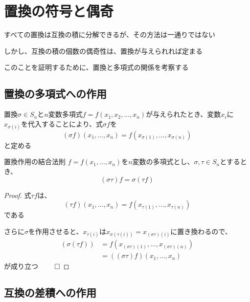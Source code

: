 \documentclass[../../../topic_linear-algebra]{subfiles}
\begin{document}
\sectionline
\section{置換の符号と偶奇}

すべての置換は互換の積に分解できるが、その方法は一通りではない

しかし、互換の積の個数の偶奇性は、置換が与えられれば定まる

\br

このことを証明するために、置換と多項式の関係を考察する

\subsection{置換の多項式への作用}

置換$\sigma \in S_n$と$n$変数多項式$f = f(x_1, x_2, \ldots, x_n)$が与えられたとき、変数$x_i$に$x_{\sigma(i)}$を代入することにより、式$\sigma f$を
\begin{equation*}
  (\sigma f)(x_1, \ldots, x_n) = f(x_{\sigma(1)}, \ldots, x_{\sigma(n)})
\end{equation*}
と定める

\begin{theorem}{置換作用の結合法則}\label{thm:permutation-action-associativity}
  $f = f(x_1,\ldots,x_n)$を$n$変数の多項式とし、$\sigma, \tau \in S_n$とするとき、
  \begin{equation*}
    (\sigma \tau) f = \sigma (\tau f)
  \end{equation*}
\end{theorem}

\begin{proof}
  式$\tau f$は、
  \begin{equation*}
    (\tau f)(x_1, \ldots, x_n) = f(x_{\tau(1)}, \ldots, x_{\tau(n)})
  \end{equation*}
  である

  さらに$\sigma$を作用させると、$x_{\tau(i)}$は$x_{\sigma(\tau(i))} = x_{(\sigma\tau)(i)}$に置き換わるので、
  \begin{align*}
    (\sigma(\tau f)) & = f(x_{(\sigma\tau)(1)}, \ldots, x_{(\sigma\tau)(n)}) \\
                     & = ((\sigma\tau) f)(x_1, \ldots, x_n)
  \end{align*}
  が成り立つ $\qed$
\end{proof}

\subsection{互換の差積への作用}
\end{document}
